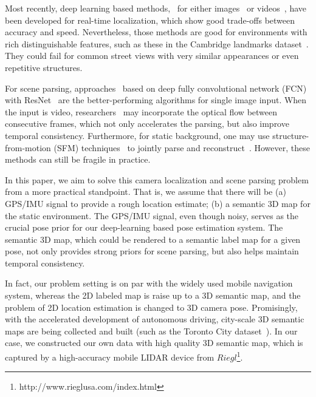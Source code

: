 Most recently, deep learning based methods, \eg~for either images~\cite{Kendall_2015_ICCV} or videos~\cite{DBLP:journals/corr/ClarkWMTW17}, have been developed for real-time localization, which show good trade-offs between accuracy and speed.
Nevertheless, those methods are good for environments with rich distinguishable features, such as these in the Cambridge landmarks dataset~\cite{Kendall_2015_ICCV}. They could fail for common street views with very similar appearances or even repetitive structures.

For scene parsing, approaches~\cite{ZhaoSQWJ16,ChenPSA17} based on deep fully convolutional network (FCN) with ResNet~\cite{HeZRS15} are the better-performing algorithms for single image input. When the input is video, researchers~\cite{kundu2016feature,zhu2016deep} may incorporate the optical flow between consecutive frames, which not only accelerates the parsing, but also improve temporal consistency. Furthermore, for static background, one may use structure-from-motion (SFM) techniques~\cite{wu2011visualsfm} to jointly parse and reconstruct~\cite{kundu2014joint}. However, these methods can still be fragile in practice.

In this paper, we aim to solve this camera localization and scene parsing problem from a more practical standpoint. That is, we assume that there will be (a) GPS/IMU signal to provide a rough location estimate; (b) a semantic 3D map for the static environment. The GPS/IMU signal, even though noisy, serves as the crucial pose prior for our deep-learning based pose estimation system. The semantic 3D map, which could be rendered to a semantic label map for a given pose, not only provides strong priors for scene parsing, but also helps maintain temporal consistency.

%
In fact, our problem setting is on par with the widely used mobile navigation system, whereas the 2D labeled map is raise up to a 3D semantic map, and the problem of 2D location estimation is changed to 3D camera pose. Promisingly, with the accelerated development of autonomous driving, city-scale 3D semantic maps are being collected and built (such as the Toronto City dataset~\cite{wang2016torontocity}).  In our case, we constructed our own data with high quality 3D semantic map, which is captured by a high-accuracy mobile LIDAR device from $Riegl$\footnote{http://www.rieglusa.com/index.html}.

